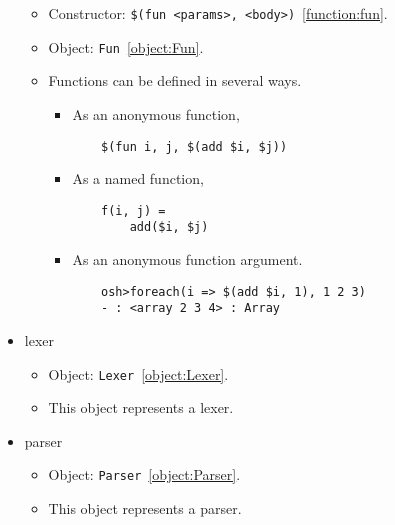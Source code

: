 \begin{itemize}
\begin{itemize}
\item Constructor: \verb+$(fun <params>, <body>)+~\ref{function:fun}.
\item Object: \verb+Fun+~\ref{object:Fun}.
\item Functions can be defined in several ways.
\begin{itemize}
\item As an anonymous function,
\begin{verbatim}
    $(fun i, j, $(add $i, $j))
\end{verbatim}
\item As a named function,
\begin{verbatim}
    f(i, j) =
        add($i, $j)
\end{verbatim}
\item
\newinkeyword
As an anonymous function argument.
\begin{verbatim}
    osh>foreach(i => $(add $i, 1), 1 2 3)
    - : <array 2 3 4> : Array
\end{verbatim}
\end{itemize}
\end{itemize}

\item lexer

\begin{itemize}
\item Object: \verb+Lexer+~\ref{object:Lexer}.
\item This object represents a lexer.
\end{itemize}

\item parser

\begin{itemize}
\item Object: \verb+Parser+~\ref{object:Parser}.
\item This object represents a parser.
\end{itemize}
\end{itemize}

